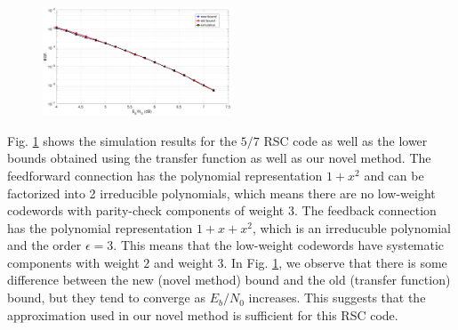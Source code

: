 \begin{figure}[htbp]
\centering
		\includegraphics[width=0.5\textwidth]{./Images/RSC_5_7_lower_weights.eps}
		\label{simFig1}
		\end{figure}
		
Fig. \ref{simFig1} shows the simulation results for the $5/7$ RSC code as well as the lower bounds obtained using the transfer function as well as our novel method. The feedforward connection has the polynomial representation $1+x^2$ and can be factorized into 2 irreducible polynomials, which means there are no low-weight codewords with parity-check components of weight $3$. The feedback connection has the polynomial representation $1+x+x^2$, which is an irreducuble polynomial and the order $\epsilon = 3$. This means that the low-weight codewords have systematic components with weight $2$ and weight $3$. In Fig. \ref{simFig1}, we observe that there is some difference between the new (novel method) bound and the old (transfer function) bound, but they tend to converge as $E_b/N_0$ increases. This suggests that the approximation used in our novel method is sufficient for this RSC code.





